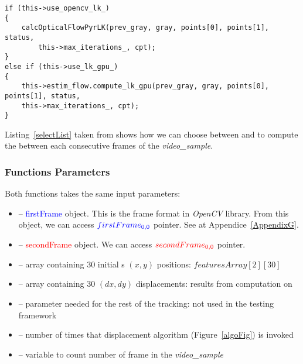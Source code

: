 \begin{lstlisting}
if (this->use_opencv_lk_)
{
	calcOpticalFlowPyrLK(prev_gray, gray, points[0], points[1], status,
        this->max_iterations_, cpt);
}
else if (this->use_lk_gpu_)
{
	this->estim_flow.compute_lk_gpu(prev_gray, gray, points[0], points[1], status,
	this->max_iterations_, cpt);
}
\end{lstlisting}


Listing~\ref{selectList} taken from  shows how we can choose between  and  to compute the \flow{} between each consecutive frames of the \emph{video\_sample}.


\subsubsection{Functions Parameters}\label{fctParams}

Both functions takes the same input parameters:
\begin{itemize}
	\item {} -- \textcolor{blue}{firstFrame}  object. This is the frame format in \emph{OpenCV} library. From this object, we can access $\textcolor{blue}{firstFrame_{0,0}}$ pointer. See  at Appendice~\ref{AppendixG}.
	\item {} -- \textcolor{red}{secondFrame}  object. We can access $\textcolor{red}{secondFrame_{0,0}}$ pointer.
	\item {} -- array containing 30 initial \feat{}s $(x,y)$ positions:  $featuresArray[2][30]$
	\item {} -- array containing 30 $(dx, dy)$ displacements: results from \flow{} computation on \vc
	\item {} -- parameter needed for the rest of the tracking: not used in the testing framework
	\item {} -- number of times that displacement algorithm (Figure~\ref{algoFig}) is invoked
	\item {} -- variable to count number of frame in the \emph{video\_sample}
\end{itemize}


